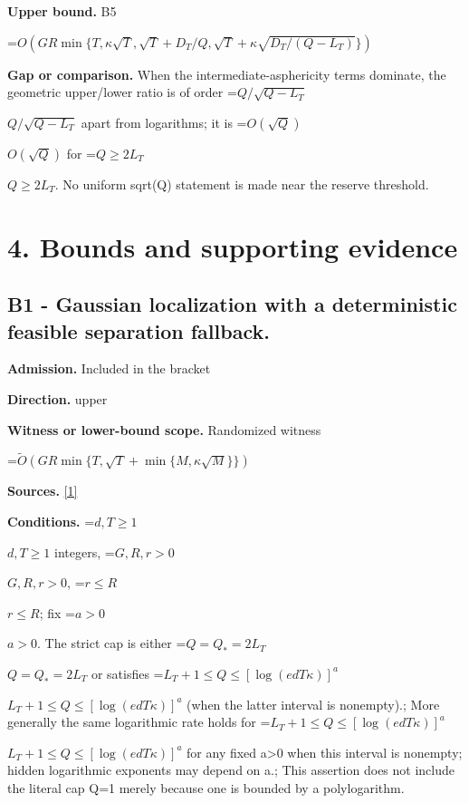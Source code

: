 \documentclass[10pt,a4paper]{article}
\newcommand{\AtlasMath}[1]{\par\begingroup\centering\setbox0=\hbox{$\displaystyle #1$}\ifdim\wd0>1.4\linewidth\typeout{ATLAS WIDE FORMULA: \the\wd0}\fi\ifdim\wd0>\linewidth\resizebox{\linewidth}{!}{\box0}\else\box0\fi\par\endgroup}
\newcommand{\AtlasInlineMath}[1]{\begingroup\setbox0=\hbox{$#1$}\ifdim\wd0>.4\linewidth\endgroup\AtlasMath{#1}\else\endgroup$#1$\fi}
\begin{document}
\textbf{Upper bound.} B5



\AtlasMath{O\!\left(GR\min\{T,\kappa\sqrt T,\sqrt T+D_T/Q,\sqrt T+\kappa\sqrt{D_T/(Q-L_T)}\}\right)}


\textbf{Gap or comparison.} When the intermediate-asphericity terms dominate, the geometric upper/lower ratio is of order \AtlasInlineMath{Q/\sqrt{Q-L_T}} apart from logarithms; it is \AtlasInlineMath{O(\sqrt Q)} for \AtlasInlineMath{Q\ge2L_T}. No uniform sqrt(Q) statement is made near the reserve threshold.



\section{4. Bounds and supporting evidence}


\subsection{B1 - Gaussian localization with a deterministic feasible separation fallback.}


\textbf{Admission.} Included in the bracket



\textbf{Direction.} upper



\textbf{Witness or lower-bound scope.} Randomized witness



\AtlasMath{\widetilde O(GR\min\{T,\sqrt T+\min\{M,\kappa\sqrt M\}\})}


\textbf{Sources.} \href{https://github.com/WU-Wendao/Colombo/blob/main/colombo_sensorium/Complexity_altas/data/sources/colombo/U08/manuscript.pdf}{[1]}



\textbf{Conditions.} \AtlasInlineMath{d,T\ge1} integers, \AtlasInlineMath{G,R,r>0}, \AtlasInlineMath{r\le R}; fix \AtlasInlineMath{a>0}. The strict cap is either \AtlasInlineMath{Q=Q_*=2L_T} or satisfies \AtlasInlineMath{L_T+1\le Q\le[\log(edT\kappa)]^a} (when the latter interval is nonempty).; More generally the same logarithmic rate holds for \AtlasInlineMath{L_T+1\le Q\le[\log(edT\kappa)]^a} for any fixed a>0 when this interval is nonempty; hidden logarithmic exponents may depend on a.; This assertion does not include the literal cap Q=1 merely because one is bounded by a polylogarithm.
\end{document}
